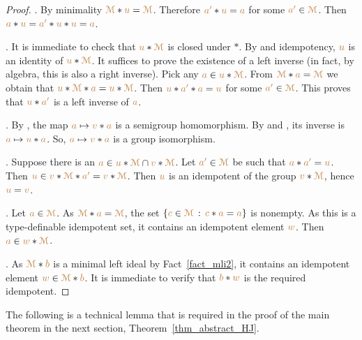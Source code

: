 \begin{proof}
  .
  By minimality $\mrM*{\mr u}=\mrM$.
  Therefore ${\mr a'}*{\mr u}={\mr a}$ for some ${\mr a'}\in\mrM$.
  Then ${\mr a}*{\mr u}={\mr a'}*{\mr u}*{\mr u}={\mr a}$.

  . 
  It is immediate to check that ${\mr u}*\mrM $ is closed under $*$.
  By  and idempotency, ${\mr u}$ is an identity of ${\mr u}*\mrM$.
  It suffices to prove the existence of a left inverse (in fact, by algebra, this is also a right inverse).
  Pick any ${\mr a}\in{\mr u}*\mrM$.
  From $\mrM*{\mr a}=\mrM$ we obtain that ${\mr u}*\mrM*{\mr a}={\mr u}*\mrM$.
  Then ${\mr u}*{\mr a'}*{\mr a}={\mr u}$ for some ${\mr a'}\in\mrM$.
  This proves that ${\mr u}*{\mr a'}$ is a left inverse of ${\mr a}$.

  .
  By , the map ${\mr a}\mapsto{\mr v}*{\mr a}$ is a semigroup homomorphism.
  By  and , its inverse is ${\mr a}\mapsto{\mr u}*{\mr a}$.
  So, ${\mr a}\mapsto{\mr v}*{\mr a}$ is a group isomorphism.

  .
  Suppose there is an ${\mr a}\in{\mr u}*\mrM\cap{\mr v}*\mrM$.
  Let ${\mr a'}\in\mrM$ be such that ${\mr a}*{\mr a'}={\mr u}$.
  Then ${\mr u}\in{\mr v}*\mrM*{\mr a'}={\mr v}*\mrM$.
  Then ${\mr u}$ is an idempotent of the group ${\mr v}*\mrM$, hence ${\mr u}={\mr v}$.

  .
  Let ${\mr a}\in\mrM$.
  As $\mrM*{\mr a}=\mrM$, the set $\{ {\mr c}\in\mrM\,:\, {\mr c}* {\mr a} =  {\mr a}\}$ is nonempty.
  As this is a type-definable idempotent set, it contains an idempotent element ${\mr w}$.
  Then ${\mr a}\in{\mr w}*\mrM$.
  
  .
  As $\mrM*{\mr b}$ is a minimal left ideal by Fact~\ref{fact_mli2}, it contains an idempotent element ${\mr w}\in\mrM*{\mr b}$.
  It is immediate to verify that ${\mr b}*{\mr w}$ is the required idempotent.
\end{proof}

The following is a technical lemma that is required in the proof of the main theorem in the next section, Theorem~\ref{thm_abstract_HJ}.

